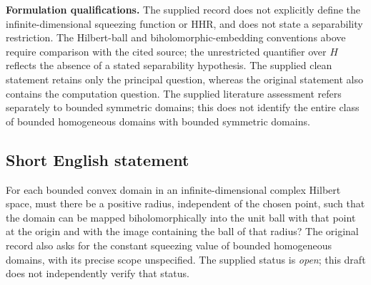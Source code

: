 \documentclass[11pt]{article}
\begin{document}
\textbf{Formulation qualifications.} The supplied record does not explicitly define the infinite-dimensional squeezing function or HHR, and does not state a separability restriction. The Hilbert-ball and biholomorphic-embedding conventions above require comparison with the cited source; the unrestricted quantifier over \(H\) reflects the absence of a stated separability hypothesis. The supplied clean statement retains only the principal question, whereas the original statement also contains the computation question. The supplied literature assessment refers separately to bounded symmetric domains; this does not identify the entire class of bounded homogeneous domains with bounded symmetric domains.
\subsection{Short English statement}
For each bounded convex domain in an infinite-dimensional complex Hilbert space, must there be a positive radius, independent of the chosen point, such that the domain can be mapped biholomorphically into the unit ball with that point at the origin and with the image containing the ball of that radius? The original record also asks for the constant squeezing value of bounded homogeneous domains, with its precise scope unspecified. The supplied status is \emph{open}; this draft does not independently verify that status.
\end{document}
